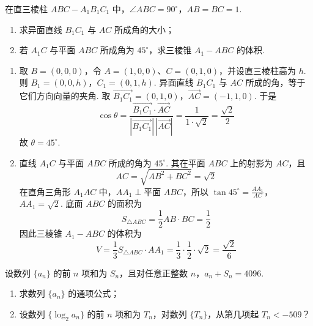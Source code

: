 \begin{problem}
在直三棱柱 \(ABC - A_{1}B_{1}C_{1}\) 中，\(\angle ABC = 90^{\circ}\)，\(AB = BC = 1\).
\begin{enumerate}
\item 求异面直线 \(B_{1}C_{1}\) 与 \(AC\) 所成角的大小；
\item 若 \(A_{1}C\) 与平面 \(ABC\) 所成角为 \(45^{\circ}\)，求三棱锥 \(A_{1} - ABC\) 的体积.
\end{enumerate}

\end{problem}

\begin{solution}
\begin{enumerate}
\item 取 \(B=(0,0,0)\)，令 \(A=(1,0,0)\)、\(C=(0,1,0)\)，并设直三棱柱高为 \(h\). 则
\(B_1=(0,0,h)\)，\(C_1=(0,1,h)\).
异面直线 \(B_1C_1\) 与 \(AC\) 所成的角，等于它们方向向量的夹角. 取
\(\overrightarrow{B_1C_1}=(0,1,0)\)，\(\overrightarrow{AC}=(-1,1,0)\).
于是
\[
\cos\theta
=\frac{\overrightarrow{B_1C_1}\cdot\overrightarrow{AC}}
{|\overrightarrow{B_1C_1}|\,|\overrightarrow{AC}|}
=\frac{1}{1\cdot\sqrt2}
=\frac{\sqrt2}{2}
\]
故 \(\theta=45^\circ\).
\item 直线 \(A_1C\) 与平面 \(ABC\) 所成的角为 \(45^\circ\). 其在平面 \(ABC\) 上的射影为 \(AC\)，且
\[
AC=\sqrt{AB^2+BC^2}=\sqrt2
\]
在直角三角形 \(A_1AC\) 中，\(AA_1\perp\text{平面 }ABC\)，所以
\(\tan45^\circ=\frac{AA_1}{AC}\)，\(AA_1=\sqrt2\).
底面 \(ABC\) 的面积为
\[
S_{\triangle ABC}=\frac12 AB\cdot BC=\frac12
\]
因此三棱锥 \(A_1-ABC\) 的体积为
\[
V=\frac13S_{\triangle ABC}\cdot AA_1
=\frac13\cdot\frac12\cdot\sqrt2
=\frac{\sqrt2}{6}
\]
\end{enumerate}
\end{solution}

\begin{problem}
设数列 \(\{a_n\}\) 的前 \(n\) 项和为 \(S_n\)，且对任意正整数 \(n\)，\(a_n + S_n = 4096\).
\begin{enumerate}
\item 求数列 \(\{a_n\}\) 的通项公式；
\item 设数列 \(\{\log_2 a_n\}\) 的前 \(n\) 项和为 \(T_n\)，对数列 \(\{T_n\}\)，从第几项起 \(T_n < -509\)？
\end{enumerate}
\end{problem}

